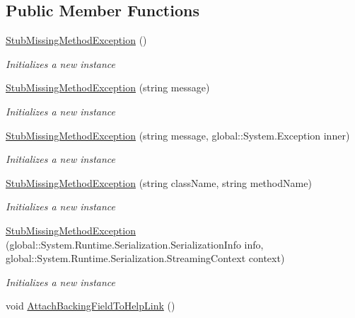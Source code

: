 \subsection*{Public Member Functions}
\begin{DoxyCompactItemize}
\item 
\hyperlink{class_system_1_1_fakes_1_1_stub_missing_method_exception_a65be7905cb4fe6866e9c485ee56fbb69}{Stub\-Missing\-Method\-Exception} ()
\begin{DoxyCompactList}\small\item\em Initializes a new instance\end{DoxyCompactList}\item 
\hyperlink{class_system_1_1_fakes_1_1_stub_missing_method_exception_a707de0cc3a1102e1cb8cea1cb4f3f6ac}{Stub\-Missing\-Method\-Exception} (string message)
\begin{DoxyCompactList}\small\item\em Initializes a new instance\end{DoxyCompactList}\item 
\hyperlink{class_system_1_1_fakes_1_1_stub_missing_method_exception_ae72855cc5731cb01aa99120c1ff71873}{Stub\-Missing\-Method\-Exception} (string message, global\-::\-System.\-Exception inner)
\begin{DoxyCompactList}\small\item\em Initializes a new instance\end{DoxyCompactList}\item 
\hyperlink{class_system_1_1_fakes_1_1_stub_missing_method_exception_a13e4d705584818d9b2d6c43a5ca3ef9b}{Stub\-Missing\-Method\-Exception} (string class\-Name, string method\-Name)
\begin{DoxyCompactList}\small\item\em Initializes a new instance\end{DoxyCompactList}\item 
\hyperlink{class_system_1_1_fakes_1_1_stub_missing_method_exception_a41bce6586592c80a727edd003961f284}{Stub\-Missing\-Method\-Exception} (global\-::\-System.\-Runtime.\-Serialization.\-Serialization\-Info info, global\-::\-System.\-Runtime.\-Serialization.\-Streaming\-Context context)
\begin{DoxyCompactList}\small\item\em Initializes a new instance\end{DoxyCompactList}\item 
void \hyperlink{class_system_1_1_fakes_1_1_stub_missing_method_exception_ac136e431ea7f8f8ffa55be9374cb872b}{Attach\-Backing\-Field\-To\-Help\-Link} ()

\end{DoxyCompactItemize}
